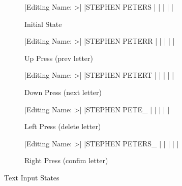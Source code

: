 \documentclass[journal,compsoc]{IEEEtran}
\begin{document}
\begin{figure}
  \begin{subfigure}{0.48\textwidth}
  	\centering
     |Editing Name:  >|
                |STEPHEN PETERS  |
                |                |
                |                |
    \caption{Initial State}
    \label{menu input start}
  \end{subfigure}
  \begin{subfigure}{0.48\textwidth}
  	\centering
     |Editing Name:  >|
                |STEPHEN PETERR  |
                |                |
                |                |
    \caption{Up Press (prev letter)}
    \label{menu input up}
  \end{subfigure}
  \begin{subfigure}{0.48\textwidth}
  	\centering
     |Editing Name:  >|
                |STEPHEN PETERT  |
                |                |
                |                |
    \caption{Down Press (next letter)}
    \label{menu input down}
  \end{subfigure}
  \begin{subfigure}{0.48\textwidth}
  	\centering
     |Editing Name:  >|
                |STEPHEN PETE_   |
                |                |
                |                |
    \caption{Left Press (delete letter)}
    \label{menu input left}
  \end{subfigure}
  \begin{subfigure}{0.48\textwidth}
  	\centering
     |Editing Name:  >|
                |STEPHEN PETERS_ |
                |                |
                |                |
    \caption{Right Press (confim letter)}
    \label{menu input right}
  \end{subfigure}
  \caption{Text Input States}
\end{figure}
\end{document}
